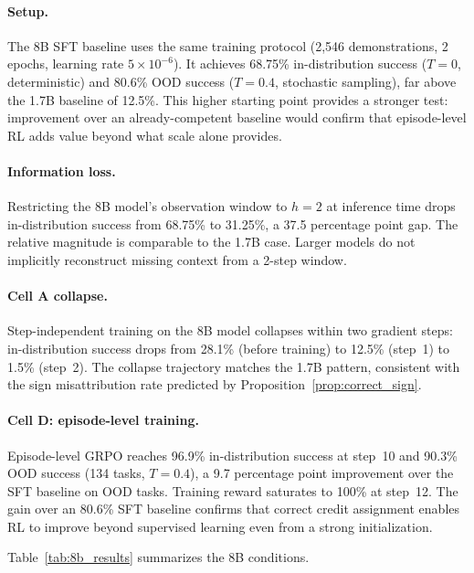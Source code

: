 \paragraph{Setup.}
The 8B SFT baseline uses the same training protocol (2{,}546 demonstrations, 2 epochs, learning rate $5 \times 10^{-6}$). It achieves 68.75\% in-distribution success ($T{=}0$, deterministic) and 80.6\% OOD success ($T{=}0.4$, stochastic sampling), far above the 1.7B baseline of 12.5\%.%
This higher starting point provides a stronger test: improvement over an already-competent baseline would confirm that episode-level RL adds value beyond what scale alone provides.

\paragraph{Information loss.}
Restricting the 8B model's observation window to $h{=}2$ at inference time drops in-distribution success from 68.75\% to 31.25\%, a 37.5 percentage point gap.%
The relative magnitude is comparable to the 1.7B case. Larger models do not implicitly reconstruct missing context from a 2-step window.

\paragraph{Cell A collapse.}
Step-independent training on the 8B model collapses within two gradient steps: in-distribution success drops from 28.1\% (before training) to 12.5\% (step~1) to 1.5\% (step~2).%
The collapse trajectory matches the 1.7B pattern, consistent with the sign misattribution rate predicted by Proposition~\ref{prop:correct_sign}.

\paragraph{Cell D: episode-level training.}
Episode-level GRPO reaches 96.9\% in-distribution success at step~10 and 90.3\% OOD success (134 tasks, $T{=}0.4$), a 9.7 percentage point improvement over the SFT baseline on OOD tasks.%
Training reward saturates to 100\% at step~12. The gain over an 80.6\% SFT baseline confirms that correct credit assignment enables RL to improve beyond supervised learning even from a strong initialization.

Table~\ref{tab:8b_results} summarizes the 8B conditions.

